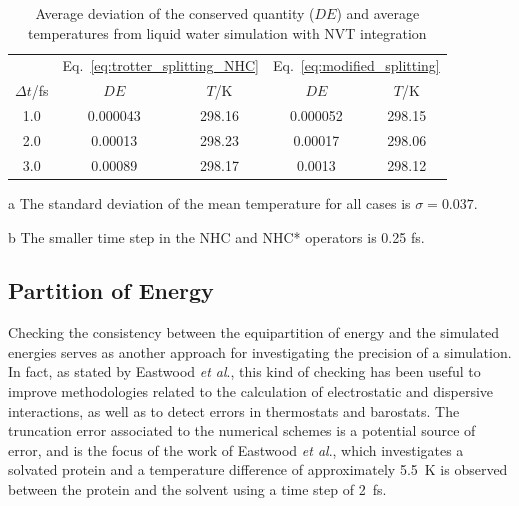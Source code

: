 \documentclass[aip,jcp,reprint,amsmath,amssymb,raggedbottom]{revtex4-1}
\begin{document}
\begin{table}
	\begin{threeparttable}
		\caption{Average deviation of the conserved quantity ($DE$) and average temperatures from liquid water simulation with NVT integration }
		\label{table:denvt}
		\begin{ruledtabular}
			\begin{tabular}{ccccc}
				& \multicolumn{2}{c}{Eq.~\ref{eq:trotter_splitting_NHC}} & \multicolumn{2}{c}{Eq.~\ref{eq:modified_splitting}} \\
				\cline{2-5}
				$\Delta t$/fs & $D\!E$ & $T$/K & $D\!E$ & $T$/K \\
				\hline
				1.0 & 0.000043 & 298.16  & 0.000052  & 298.15 \\
				2.0 & 0.00013  & 298.23  & 0.00017   & 298.06 \\
				3.0 & 0.00089  & 298.17  & 0.0013    & 298.12
			\end{tabular}
		\end{ruledtabular}
		\begin{tablenotes}
			\item[a] The standard deviation of the mean temperature for all cases is $\sigma = 0.037$.
			\item[b] The smaller time step in the NHC and NHC* operators is 0.25 fs.
		\end{tablenotes}
	\end{threeparttable}
\end{table}

\subsection{Partition of Energy}
\label{sec:energypartition}

Checking the consistency between the equipartition of energy and the simulated energies serves as another approach for investigating the precision of a simulation. In fact, as stated by Eastwood \textit{et al}.,\cite{Eastwood_2010} this kind of checking has been useful to improve methodologies related to the calculation of  electrostatic\cite{Levitt_1988, Guenot_1992, Arnold_1994} and dispersive\cite{Sagui_1999} interactions, as well as to detect errors in thermostats\cite{Harvey_1998, Mor_2008} and barostats.\cite{Feller_1995} The truncation error associated to the numerical schemes is a potential source of error, and is the focus of the work of Eastwood \textit{et al}.,\cite{Eastwood_2010} which investigates a solvated protein and a temperature difference of approximately 5.5~K is observed between the protein and the solvent using a time step of 2~fs.
\end{document}
